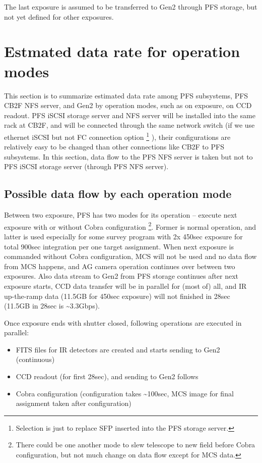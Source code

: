 \documentclass[a4paper,notitlepage]{article}
\begin{document}
The last exposure is assumed to be transferred to Gen2 through PFS storage, 
but not yet defined for other exposures. 


\section{Estmated data rate for operation modes}

This section is to summarize estimated data rate among PFS subsystems, PFS 
CB2F NFS server, and Gen2 by operation modes, such as on exposure, on CCD 
readout. 
PFS iSCSI storage server and NFS server will be installed into the same rack 
at CB2F, and will be connected through the same network switch (if we use 
ethernet iSCSI but not FC connection option
\footnote{Selection is just to replace SFP inserted into the PFS storage 
server.}
), their configurations are relatively easy to be changed than other 
connections like CB2F to PFS subsystems. 
In this section, data flow to the PFS NFS server is taken but not to 
PFS iSCSI storage server (through PFS NFS server). 

\subsection{Possible data flow by each operation mode}

Between two exposure, PFS has two modes for its operation -- execute next 
exposure with or without Cobra configuration
\footnote{There could be one another mode to slew telescope to new field 
before Cobra configuration, but not much change on data flow except for MCS 
data.}. Former is normal operation, and latter is used especially for some 
survey program with 2x 450sec exposure for total 900sec integration per one 
target assignment. 
When next exposure is commanded without Cobra configuration, MCS will not be 
used and no data flow from MCS happens, and AG camera operation continues 
over between two exposures. 
Also data stream to Gen2 from PFS storage continues after next exposure 
starts, CCD data transfer will be in parallel for (most of) all, and 
IR up-the-ramp data (11.5GB for 450sec exposure) will not finished in 28sec 
(11.5GB in 28sec is \~{}3.3Gbps). 

Once exposure ends with shutter closed, following operations are executed 
in parallel:
\begin{itemize}
  \item FITS files for IR detectors are created and starts sending to Gen2
    (continuous)
  \item CCD readout (for first 28sec), and sending to Gen2 follows
  \item Cobra configuration (configuration takes \~{}100sec, MCS image for 
    final assignment taken after configuration)
\end{itemize}
\end{document}
